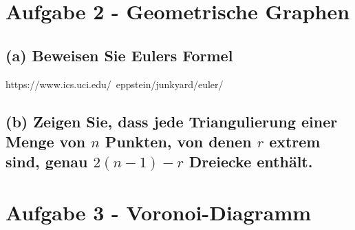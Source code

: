 \documentclass[a4paper]{article}
\begin{document}
\section*{Aufgabe 2 - Geometrische Graphen}

\subsection*{(a) Beweisen Sie Eulers Formel}

https://www.ics.uci.edu/~eppstein/junkyard/euler/

\subsection*{(b) Zeigen Sie, dass jede Triangulierung einer Menge von $n$ Punkten, von denen $r$ extrem sind, genau $2 (n - 1) - r$ Dreiecke enthält.}



\section*{Aufgabe 3 - Voronoi-Diagramm}
\end{document}
